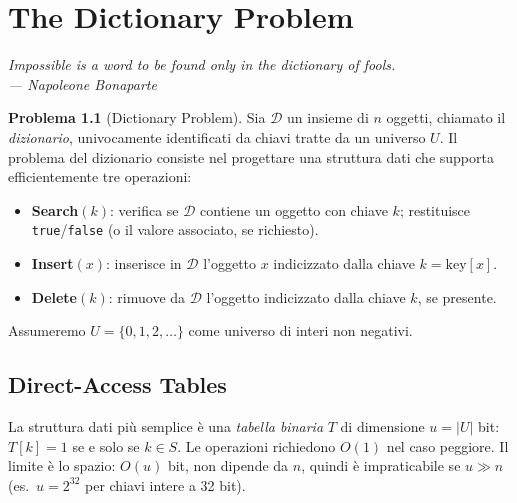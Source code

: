 \documentclass[12pt, a4paper, oneside]{book}
\theoremstyle{plain}
\theoremstyle{definition}
\newtheorem{problema}[teorema]{Problema}
\theoremstyle{remark}
\begin{document}
\chapter{The Dictionary Problem}

\begin{flushright}
\itshape Impossible is a word to be found only in the dictionary of fools.\\
--- Napoleone Bonaparte
\end{flushright}

\bigskip

\begin{problema}[Dictionary Problem]
Sia $\mathcal{D}$ un insieme di $n$ oggetti, chiamato il \emph{dizionario}, univocamente identificati da chiavi tratte da un universo $U$. Il problema del dizionario consiste nel progettare una struttura dati che supporta efficientemente tre operazioni:
\begin{itemize}
  \item \textbf{Search}$(k)$: verifica se $\mathcal{D}$ contiene un oggetto con chiave $k$; restituisce \texttt{true}/\texttt{false} (o il valore associato, se richiesto).
  \item \textbf{Insert}$(x)$: inserisce in $\mathcal{D}$ l'oggetto $x$ indicizzato dalla chiave $k = \text{key}[x]$.
  \item \textbf{Delete}$(k)$: rimuove da $\mathcal{D}$ l'oggetto indicizzato dalla chiave $k$, se presente.
\end{itemize}
\end{problema}

Assumeremo $U = \{0, 1, 2, \ldots\}$ come universo di interi non negativi.

\section{Direct-Access Tables}

La struttura dati più semplice è una \emph{tabella binaria} $T$ di dimensione $u = |U|$ bit: $T[k] = 1$ se e solo se $k \in S$. Le operazioni richiedono $O(1)$ nel caso peggiore. Il limite è lo spazio: $O(u)$ bit, non dipende da $n$, quindi è impraticabile se $u \gg n$ (es.\ $u = 2^{32}$ per chiavi intere a 32 bit).

\end{document}
